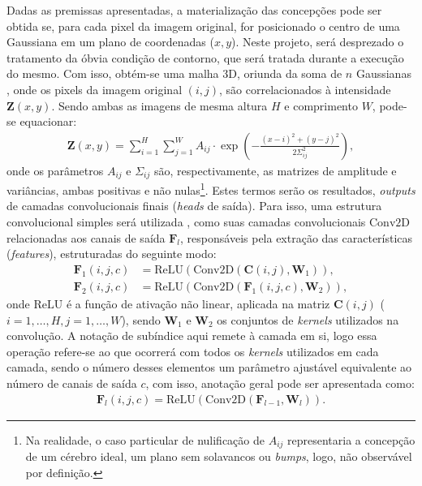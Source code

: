 \documentclass[a4paper, 12pt]{report}
\begin{document}
Dadas as premissas apresentadas, a materialização das concepções pode ser obtida se, para cada pixel da imagem original, for posicionado o centro de uma Gaussiana em um plano de coordenadas ($x,y$). Neste projeto, será desprezado o tratamento da óbvia condição de contorno, que será tratada durante a execução do mesmo. Com isso, obtém-se uma malha 3D, oriunda da soma de $n$ Gaussianas \cite{Gaussian}, onde os pixels da imagem original $(i,j)$, são correlacionados à intensidade $\mathbf{Z}(x,y)$. Sendo ambas as imagens de mesma altura $H$ e comprimento $W$, pode-se equacionar:
\begin{align}
\mathbf{Z}(x,y) = \sum_{i=1}^H \sum_{j=1}^W A_{ij} \cdot \exp\left(-\frac{(x - i)^2 + (y - j)^2}{2\Sigma_{ij}^2}\right),
	\label{eq:Z(x,y)}
\end{align} 
onde os parâmetros $A_{ij}$ e $\Sigma_{ij}$ são, respectivamente, as matrizes de amplitude e variâncias, ambas positivas e não nulas\footnote{Na realidade, o caso particular de nulificação de $A_{ij}$ representaria a concepção de um cérebro ideal, um plano sem solavancos ou \textit{bumps}, logo, não observável por definição.}. Estes termos serão os resultados, \textit{outputs} de camadas convolucionais finais (\textit{heads} de saída). Para isso, uma estrutura convolucional simples será utilizada \cite{MartinAbadi2015}, como suas camadas convolucionais $\text{Conv2D}$ relacionadas aos canais de saída $\mathbf{F}_l$, responsáveis pela extração das características (\textit{features}), estruturadas do seguinte modo: 
\begin{align}
\mathbf{F}_1(i,j,c) &= \text{ReLU}(\text{Conv2D}(\mathbf{C}(i,j), \mathbf{W}_1)), \\
\mathbf{F}_2(i,j,c) &= \text{ReLU}(\text{Conv2D}(\mathbf{F}_1(i,j,c), \mathbf{W}_2)),
\end{align} 
onde $\text{ReLU}$ é a função de ativação não linear, aplicada na matriz $\mathbf{C}(i,j)$ ($i=1,…,H,j=1,…,W$), sendo $\mathbf{W}_1$ e $\mathbf{W}_2$ os conjuntos de \textit{kernels} utilizados na convolução. A notação de subíndice aqui remete à camada em si, logo essa operação refere-se ao que ocorrerá com todos os \textit{kernels} utilizados em cada camada, sendo o número desses elementos um parâmetro ajustável equivalente ao número de canais de saída $c$, com isso, anotação geral pode ser apresentada como:
\begin{align}
\mathbf{F}_l(i, j, c) = \text{ReLU}(\text{Conv2D}(\mathbf{F}_{l-1}, \mathbf{W}_l)).
\label{eq:Fl}
\end{align} 
\end{document}
